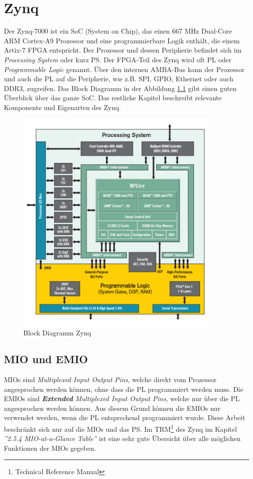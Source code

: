 
\chapter{Zynq}
Der Zynq-7000 ist ein SoC (System on Chip), das einen 667 MHz Dual-Core ARM Cortex-A9 Prozessor und eine programmierbare Logik enthält, die einem Artix-7 FPGA entspricht.
Der Prozessor und dessen Peripherie befindet sich im \textit{Processing System} oder kurz PS.
Der FPGA-Teil des Zynq wird oft PL oder \textit{Programmable Logic} genannt.
Über den internen AMBA-Bus kann der Prozessor und auch die PL auf die Peripherie, wie z.B. SPI, GPIO, Ethernet oder auch DDR3, zugreifen.
Das Block Diagramm in der Abbildung \ref{fig:BlockDiagrammZynq} gibt einen guten Überblick über das ganze SoC.
Das restliche Kapitel beschreibt relevante Komponente und Eigenarten des Zynq.

\begin{figure}[htbp]
	\centering
		\includegraphics[width=10cm,height=\textheight,keepaspectratio]{images/zynqBlockDiagram.png}
	\caption[Block Diagramm Zynq]{Block Diagramm Zynq\footnotemark}
	\label{fig:BlockDiagrammZynq}
\end{figure}


\section{MIO und EMIO}
MIOs sind \textit{Multiplexed Input Output Pins}, welche direkt vom Prozessor angesprochen werden können, ohne dass die PL programmiert werden muss.
Die EMIOs sind \textit{\textbf{Extended} Multiplexed Input Output Pins}, welche nur über die PL angesprochen werden können.
Aus diesem Grund können die EMIOs nur verwendet werden, wenn die PL entsprechend programmiert wurde.
Diese Arbeit beschränkt sich nur auf die MIOs und das PS.
Im TRM\footnote{Technical Reference Manual} des Zynq\cite{bib:ZynqTechnicalReferenceManual} im Kapitel \textit{''2.5.4 MIO-at-a-Glance Table''} ist eine sehr gute Übersicht über alle möglichen Funktionen der MIOs gegeben.

